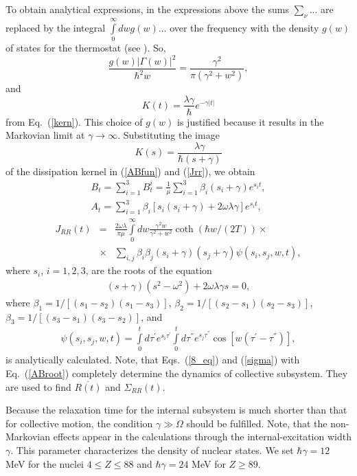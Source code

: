 \documentclass[preprint,review,12pt]{elsarticle}
\begin{document}
  To obtain analytical expressions, in the expressions above the sums $\sum_{\nu}^{}...$ are replaced by the
  integral $\int\limits_{0}^{\infty} dw g(w)...$ over the frequency with the density $g(w)$ of states  for
  the thermostat (see \cite{Katia,VAZ}). So,
  $$\frac{g(w)|\Gamma (w)|^2}{\hbar^2w}= \frac{\gamma^2}{\pi (\gamma^2+w^2)},$$
  and
  $$K(t)=\frac{\lambda\gamma}{\hbar}e^{-\gamma|t|}$$
  from Eq.~(\ref{kern}). This choice of $g(w)$ is justified because it results in the Markovian limit at $\gamma\rightarrow\infty$.
  Substituting the image $$K(s)=\frac{\lambda\gamma}{\hbar (s+\gamma)}$$ of the dissipation kernel in (\ref{ABfun}) and (\ref{Jrr}), we obtain
  \begin{eqnarray}
  B_t=\sum_{i=1}^{3}B_t^i=\frac{1}{\mu}\sum_{i=1}^{3}\beta_i(s_i+\gamma)e^{s_it},\nonumber\\
  A_t=\sum_{i=1}^{3}\beta_i[s_i(s_i+\gamma)+2\omega\lambda\gamma]e^{s_it},
  \label{ABroot}
  \end{eqnarray}
   \begin{eqnarray}
  J_{RR}(t)&=&\frac{2\omega\lambda}{\pi\mu} \int\limits_{0}^{\infty} dw\frac{\gamma^2  w}{\gamma^2+w^2}\coth(\hbar w/(2T))\times \nonumber\\
&\times&  \sum_{i,j}\beta_i\beta_j(s_i+\gamma)(s_j+\gamma)\psi(s_i,s_j,w,t),
  \label{sigma}
  \end{eqnarray}
  where $s_i$, $i=1,2,3$, are the roots of the equation
  \begin{eqnarray}
  (s+\gamma)(s^2-\omega^2)+2\omega\lambda\gamma s=0,
  \label{roots2}
  \end{eqnarray}
  where  $\beta_1=1/[(s_1-s_2)(s_1-s_3)]$,  $\beta_2=1/[(s_2-s_1)(s_2-s_3)]$, $\beta_3=1/[(s_3-s_1)(s_3-s_2)]$,
  and
  \begin{eqnarray}
  \psi(s_i,s_j,w,t)=\int\limits_{0}^{t} d\tau^{'}e^{s_i \tau^{'}} \int\limits_{0}^{t} d\tau^{''}e^{s_j \tau^{''}}
  \cos[w (\tau^{'}-\tau^{''})],
  \label{expint}
  \end{eqnarray}
  is analytically calculated.
  Note, that Eqs.~(\ref{8_eq}) and (\ref{sigma}) with Eq.~(\ref{ABroot}) completely determine the dynamics of collective subsystem. They are used to find $\overline{R(t)}$ and $\Sigma_{RR}(t)$.

  Because the relaxation time for the internal subsystem is much shorter than
  that for collective motion, the condition $\gamma\gg \Omega$ should be fulfilled.
  Note, that the non-Markovian effects appear in the calculations through the internal-excitation width $\gamma$.
  This parameter characterizes the density of nuclear states.
  We set $\hbar\gamma=12$ MeV for the nuclei $4\leq Z \leq 88$ and  $\hbar\gamma=24$ MeV for $Z\geq89$.
\end{document}
